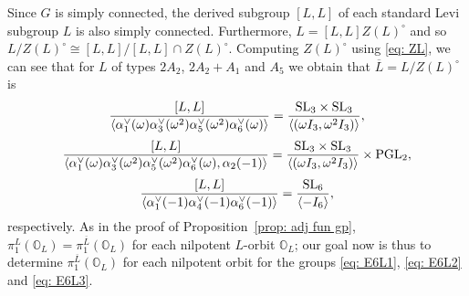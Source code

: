 \documentclass[11pt]{amsart}
\renewcommand{\O}{{\mathbb O}}
\newcommand{\SL}{{{\mbox{\rm SL}}}}
\newcommand{\PGL}{{{\mbox{\rm PGL}}}}
\numberwithin{equation}{section}
\begin{document}
	Since $G$ is simply connected, the derived subgroup $[L,L]$ of each standard Levi subgroup $L$ is also simply connected. Furthermore, $L=[L,L]Z(L)^\circ$ and so $L/Z(L)^\circ\cong [L,L]/[L,L]\cap Z(L)^\circ$. Computing $Z(L)^\circ$ using \eqref{eq: ZL}, we can see that for $L$ of types $2A_2$, $2A_2+A_1$ and $A_5$ we obtain that $\overline{L}=L/Z(L)^\circ$ is 	
	\begin{equation}\label{eq: E6L1}
		\frac{[L,L]}{\langle \alpha_1^\vee(\omega)\alpha_3^\vee(\omega^2)\alpha_5^\vee(\omega^2)\alpha_6^\vee(\omega)\rangle}=\frac{\SL_3\times \SL_3}{\langle (\omega I_3,\omega^2 I_3)\rangle},
	\end{equation}
	\begin{equation}\label{eq: E6L2}		
		\frac{[L,L]}{\langle \alpha_1^\vee(\omega)\alpha_3^\vee(\omega^2)\alpha_5^\vee(\omega^2)\alpha_6^\vee(\omega), \alpha_2(-1)\rangle}=\frac{\SL_3\times \SL_3}{\langle (\omega I_3,\omega^2 I_3)\rangle}\times \PGL_2,
	\end{equation}
	\begin{equation}\label{eq: E6L3}
		\frac{[L,L]}{\langle \alpha_1^\vee(-1)\alpha_4^\vee(-1)\alpha_6^\vee(-1)\rangle}=\frac{\SL_6}{\langle -I_6 \rangle},
	\end{equation}
	respectively. As in the proof of Proposition~\ref{prop: adj fun gp}, $\pi_1^L(\O_L)=\pi_1^{\overline{L}}(\O_L)$ for each nilpotent $L$-orbit $\O_L$; our goal now is thus to determine $\pi_1^{\overline{L}}(\O_L)$ for each nilpotent orbit for the groups \eqref{eq: E6L1}, \eqref{eq: E6L2} and \eqref{eq: E6L3}. 
	
\end{document}
